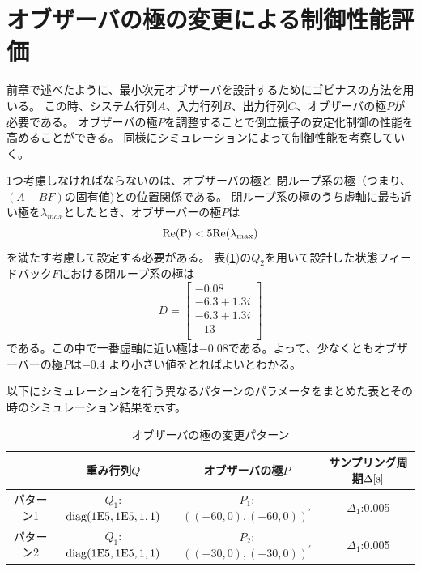 	
\section{オブザーバの極の変更による制御性能評価}
	前章で述べたように、最小次元オブザーバを設計するためにゴピナスの方法を用いる。
	この時、システム行列$A$、入力行列$B$、出力行列$C$、オブザーバの極$P$が必要である。
	オブザーバの極$P$を調整することで倒立振子の安定化制御の性能を高めることができる。
	同様にシミュレーションによって制御性能を考察していく。
	\par
	1つ考慮しなければならないのは、オブザーバの極と
	閉ループ系の極（つまり、$(A-BF)$の固有値)との位置関係である。
	閉ループ系の極のうち虚軸に最も近い極を$\lambda_{max}$としたとき、オブザーバーの極$P$は
	\[
		\rm{Re}(P) <5\rm{Re}(\lambda_{max})
	\]
	を満たす考慮して設定する必要がある。
	表(\ref{table:QRF})の$Q_2$を用いて設計した状態フィードバック$F$における閉ループ系の極は
	\begin{equation}
		D=\left[
		\begin{array}{c}
			-0.08\\
			-6.3+1.3i\\
			-6.3+1.3i\\
			-13\\
		\end{array}
		\right]
		\label{eq:Aeig}
	\end{equation}
	である。この中で一番虚軸に近い極は$-0.08$である。よって、少なくともオブザーバーの極$P$は$-0.4$
	より小さい値をとればよいとわかる。
	\par
	以下にシミュレーションを行う異なるパターンのパラメータをまとめた表とその時のシミュレーション結果を示す。
	\begin{table}[htb]
		\begin{center}
			\caption{オブザーバの極の変更パターン}
			\medskip
			
			\begin{tabular}{|c|c|c|c|}\hline
				\ \ & 重み行列$Q$ & オブザーバの極$P$ & サンプリング周期$\Delta[\rm{s}]$ \\ \hline\hline
				パターン1 & $Q_1$:$\rm{diag}(1E5,1E5,1,1)$ & $P_1$:$((-60,0),(-60,0))^{'}$ & $\Delta_1$:0.005 \\ \hline
				パターン2 & $Q_1$:$\rm{diag}(1E5,1E5,1,1)$ & $P_2$:$((-30,0),(-30,0))^{'}$ & $\Delta_1$:0.005 \\ \hline
			\end{tabular}
		\end{center}
		\label{table:QRF}
	\end{table}
	
